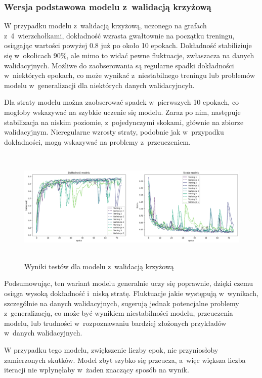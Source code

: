 \subsubsection{Wersja podstawowa modelu z~walidacją krzyżową}

W przypadku modelu z~walidacją krzyżową, uczonego na grafach z~4~wierzchołkami,
dokładność wzrasta gwałtownie na początku treningu,
osiągając wartości powyżej 0.8 już po około 10 epokach.
Dokładność stabiliziuje się w~okolicach 90\%, ale mimo to widać pewne fluktuacje, zwłaszacza na danych walidacyjnych.
Możliwe do zaobserowania są regularne spadki dokładności w~niektórych epokach,
co może wynikać z~niestabilnego treningu lub problemów modelu w~generalizacji dla niektórych danych walidacyjncyh.

Dla straty modelu można zaobserować spadek w~pierwszych 10 epokach, co mogłoby wskazywać na szybkie uczenie się modelu.
Zaraz po nim, następuje stabilizacja na niskim poziomie, z~pojedynczymi skokami, głównie na zbiorze walidacyjnym.
Nieregularne wzrosty straty, podobnie jak w~przypadku dokładności, mogą wskazywać na problemy z~przeuczeniem.

\begin{figure}[ht]
	\centering
	\includegraphics[height=5.5cm]{resources/tests/images/v3/crossvalid_img.png}
	\caption{Wyniki testów dla modelu z~walidacją krzyżową}
	\label{Fig:tests-cv-0a}
\end{figure}
\FloatBarrier

Podsumowując, ten wariant modelu generalnie uczy się poprawnie, dzięki czemu osiąga wysoką dokładność i~niską stratę.
Fluktuacje jakie występują w~wynikach, szczególnie na danych walidacyjnych,
sugerują jednak potencjalne problemy z~generalizacją, co może być wynikiem niestabilności modelu,
przeuczenia modelu, lub trudności w~rozpoznawaniu bardziej złożonych przykładów w~danych walidacyjnych.

W przypadku tego modelu, zwiększenie liczby epok, nie przyniosłoby zamierzonych skutków.
Model zbyt szybko się przeucza, a~więc większa liczba iteracji nie wpłynęłaby w~żaden znaczący sposób na wynik.

